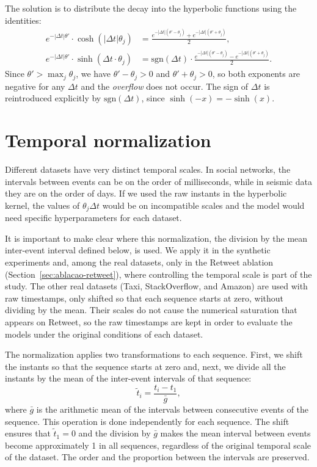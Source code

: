 The solution is to distribute the decay into the hyperbolic functions using the identities:
%
\begin{align}
    e^{-|\Delta t|\theta'} \cdot \cosh(|\Delta t|\theta_j)
    &= \frac{e^{-|\Delta t|(\theta' - \theta_j)} + e^{-|\Delta t|(\theta' + \theta_j)}}{2},
    \label{eq:decay-cosh}\\[4pt]
    e^{-|\Delta t|\theta'} \cdot \sinh(\Delta t \cdot \theta_j)
    &= \mathrm{sgn}(\Delta t) \cdot \frac{e^{-|\Delta t|(\theta' - \theta_j)} - e^{-|\Delta t|(\theta' + \theta_j)}}{2}.
    \label{eq:decay-sinh}
\end{align}
%
Since $\theta' > \max_j \theta_j$, we have $\theta' - \theta_j > 0$ and $\theta' + \theta_j > 0$, so both exponents are negative for any $\Delta t$ and the \textit{overflow} does not occur. The sign of $\Delta t$ is reintroduced explicitly by $\mathrm{sgn}(\Delta t)$, since $\sinh(-x) = -\sinh(x)$.

\section{Temporal normalization}
\label{sec:normalizacao-temporal}

Different datasets have very distinct temporal scales. In social networks, the intervals between events can be on the order of milliseconds, while in seismic data they are on the order of days. If we used the raw instants in the hyperbolic kernel, the values of $\theta_j \Delta t$ would be on incompatible scales and the model would need specific hyperparameters for each dataset.

It is important to make clear where this normalization, the division by the mean inter-event interval defined below, is used. We apply it in the synthetic experiments and, among the real datasets, only in the Retweet ablation (Section~\ref{sec:ablacao-retweet}), where controlling the temporal scale is part of the study. The other real datasets (Taxi, StackOverflow, and Amazon) are used with raw timestamps, only shifted so that each sequence starts at zero, without dividing by the mean. Their scales do not cause the numerical saturation that appears on Retweet, so the raw timestamps are kept in order to evaluate the models under the original conditions of each dataset.

The normalization applies two transformations to each sequence. First, we shift the instants so that the sequence starts at zero and, next, we divide all the instants by the mean of the inter-event intervals of that sequence:
%
\begin{equation}
    \tilde{t}_i = \frac{t_i - t_1}{\bar{g}},
    \label{eq:normalizacao-temporal}
\end{equation}
%
where $\bar{g}$ is the arithmetic mean of the intervals between consecutive events of the sequence. This operation is done independently for each sequence. The shift ensures that $\tilde{t}_1 = 0$ and the division by $\bar{g}$ makes the mean interval between events become approximately 1 in all sequences, regardless of the original temporal scale of the dataset. The order and the proportion between the intervals are preserved.

